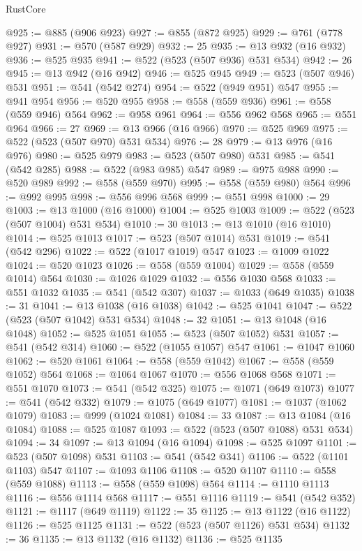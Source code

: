 \begin{lexlean}{RustCore}
\begin{coremodule}
@925 := @885 (@906 @923)
@927 := @855 (@872 @925)
@929 := @761 (@778 @927)
@931 := @570 (@587 @929)
@932 := 25
@935 := @13 @932 (@16 @932)
@936 := @525 @935
@941 := @522 (@523 (@507 @936) @531 @534)
@942 := 26
@945 := @13 @942 (@16 @942)
@946 := @525 @945
@949 := @523 (@507 @946) @531
@951 := @541 (@542 @274)
@954 := @522 (@949 @951) @547
@955 := @941 @954
@956 := @520 @955
@958 := @558 (@559 @936)
@961 := @558 (@559 @946) @564
@962 := @958 @961
@964 := @556 @962 @568
@965 := @551 @964
@966 := 27
@969 := @13 @966 (@16 @966)
@970 := @525 @969
@975 := @522 (@523 (@507 @970) @531 @534)
@976 := 28
@979 := @13 @976 (@16 @976)
@980 := @525 @979
@983 := @523 (@507 @980) @531
@985 := @541 (@542 @285)
@988 := @522 (@983 @985) @547
@989 := @975 @988
@990 := @520 @989
@992 := @558 (@559 @970)
@995 := @558 (@559 @980) @564
@996 := @992 @995
@998 := @556 @996 @568
@999 := @551 @998
@1000 := 29
@1003 := @13 @1000 (@16 @1000)
@1004 := @525 @1003
@1009 := @522 (@523 (@507 @1004) @531 @534)
@1010 := 30
@1013 := @13 @1010 (@16 @1010)
@1014 := @525 @1013
@1017 := @523 (@507 @1014) @531
@1019 := @541 (@542 @296)
@1022 := @522 (@1017 @1019) @547
@1023 := @1009 @1022
@1024 := @520 @1023
@1026 := @558 (@559 @1004)
@1029 := @558 (@559 @1014) @564
@1030 := @1026 @1029
@1032 := @556 @1030 @568
@1033 := @551 @1032
@1035 := @541 (@542 @307)
@1037 := @1033 (@649 @1035)
@1038 := 31
@1041 := @13 @1038 (@16 @1038)
@1042 := @525 @1041
@1047 := @522 (@523 (@507 @1042) @531 @534)
@1048 := 32
@1051 := @13 @1048 (@16 @1048)
@1052 := @525 @1051
@1055 := @523 (@507 @1052) @531
@1057 := @541 (@542 @314)
@1060 := @522 (@1055 @1057) @547
@1061 := @1047 @1060
@1062 := @520 @1061
@1064 := @558 (@559 @1042)
@1067 := @558 (@559 @1052) @564
@1068 := @1064 @1067
@1070 := @556 @1068 @568
@1071 := @551 @1070
@1073 := @541 (@542 @325)
@1075 := @1071 (@649 @1073)
@1077 := @541 (@542 @332)
@1079 := @1075 (@649 @1077)
@1081 := @1037 (@1062 @1079)
@1083 := @999 (@1024 @1081)
@1084 := 33
@1087 := @13 @1084 (@16 @1084)
@1088 := @525 @1087
@1093 := @522 (@523 (@507 @1088) @531 @534)
@1094 := 34
@1097 := @13 @1094 (@16 @1094)
@1098 := @525 @1097
@1101 := @523 (@507 @1098) @531
@1103 := @541 (@542 @341)
@1106 := @522 (@1101 @1103) @547
@1107 := @1093 @1106
@1108 := @520 @1107
@1110 := @558 (@559 @1088)
@1113 := @558 (@559 @1098) @564
@1114 := @1110 @1113
@1116 := @556 @1114 @568
@1117 := @551 @1116
@1119 := @541 (@542 @352)
@1121 := @1117 (@649 @1119)
@1122 := 35
@1125 := @13 @1122 (@16 @1122)
@1126 := @525 @1125
@1131 := @522 (@523 (@507 @1126) @531 @534)
@1132 := 36
@1135 := @13 @1132 (@16 @1132)
@1136 := @525 @1135

\end{coremodule}
\end{lexlean}

